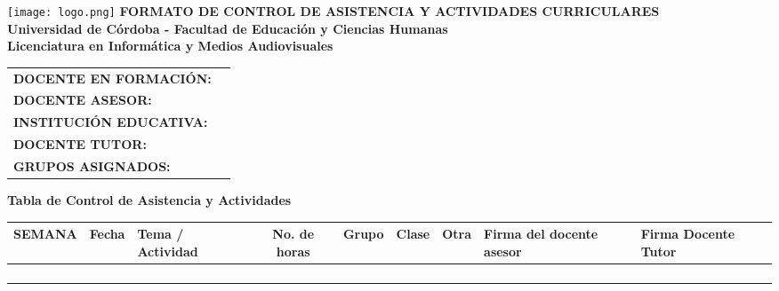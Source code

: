 \documentclass[a4paper,12pt]{article}
\begin{document}
\begin{center}
    \vspace*{1cm}
    \texttt{[image: logo.png]} %
    \vspace{0.5cm}
    \textbf{\Large FORMATO DE CONTROL DE ASISTENCIA Y ACTIVIDADES CURRICULARES} \\
    \vspace{0.5cm}
    \textbf{Universidad de Córdoba - Facultad de Educación y Ciencias Humanas} \\
    \textbf{Licenciatura en Informática y Medios Audiovisuales}
\end{center}

\vspace{0.5cm}
\begin{tabularx}{\textwidth}{@{}p{5cm}X@{}}
    \toprule
    \textbf{DOCENTE EN FORMACIÓN:} & \hrulefill \\
    \textbf{DOCENTE ASESOR:} & \hrulefill \\
    \textbf{INSTITUCIÓN EDUCATIVA:} & \hrulefill \\
    \textbf{DOCENTE TUTOR:} & \hrulefill \\
    \textbf{GRUPOS ASIGNADOS:} & \hrulefill \\
    \bottomrule
\end{tabularx}

\vspace{0.5cm}
\noindent
\textbf{Tabla de Control de Asistencia y Actividades}
\begin{table}[h]
    \centering
    \scriptsize %
    \begin{tabularx}{\textwidth}{|c|X|X|c|X|c|c|X|X|}
        \hline
        \textbf{SEMANA} & \textbf{Fecha} & \textbf{Tema / Actividad} & \textbf{No. de horas} & \textbf{Grupo} & \textbf{Clase} & \textbf{Otra} & \textbf{Firma del docente asesor} & \textbf{Firma Docente Tutor} \\
        \hline
        & & & & & & & & \\
        \hline
        & & & & & & & & \\
        \hline
        & & & & & & & & \\
        \hline
        & & & & & & & & \\
        \hline
    \end{tabularx}
\end{table}
\end{document}

